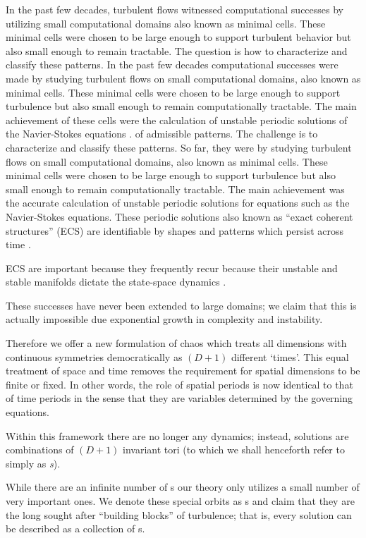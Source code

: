 In the past few decades, turbulent flows witnessed computational successes
by utilizing small computational domains also known as minimal cells.
These minimal cells were chosen to be large
enough to support turbulent behavior but also small enough to
remain tractable.
The question is how to characterize and classify these patterns.
In the past few decades computational successes were made
by studying turbulent flows on small computational domains, also known as minimal cells.
These minimal cells
were chosen to be large
enough to support turbulence but also small enough to
remain computationally tractable.
The main achievement of these cells
were the calculation of unstable periodic solutions of the
Navier-Stokes equations . %
of admissible patterns.
The challenge is to characterize and classify these patterns.
So far, they were
by studying turbulent flows on small computational domains, also known as minimal cells.
These minimal cells
were chosen to be large
enough to support turbulence but also small enough to
remain computationally tractable.
The main achievement
was the accurate calculation of unstable periodic solutions for
equations such as the Navier-Stokes equations. %
These periodic solutions also known as ``exact coherent structures'' (ECS) are
identifiable by shapes and patterns
which persist across time .

ECS are important because they frequently recur because their
unstable and stable manifolds dictate the state-space dynamics .

These successes have never been extended to large domains; we claim
that this is actually impossible due exponential growth in complexity and instability.


Therefore we offer a new {\spt} formulation of chaos which
treats all dimensions with continuous symmetries democratically as $(D+1)$ different `times'.
This equal treatment of space and time removes the requirement for
spatial dimensions to be finite or fixed. In other words,
the role of spatial periods is now identical to that of time periods
in the sense that they are
variables determined by the governing equations.


Within this framework there
are no longer any dynamics; instead, solutions are {\spt} combinations of
$(D+1)$ invariant tori (to which we shall henceforth refer to simply as \emph{{\po}s}).

While there are an infinite number of {\po}s our theory only utilizes a small
number of very important ones. We denote these special orbits as {\fpo}s and claim
that they are the long sought after ``building blocks''
of turbulence; that is, every solution can be described as a collection of {\fpo}s.

